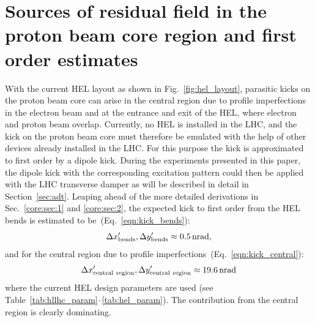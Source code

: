 \documentclass[%
 reprint,
 amsmath,amssymb,
 aps,
prstab,
]{revtex4-1}
\begin{document}
\section{Sources of residual field in the proton beam core region and first order estimates\label{sec:core}}
With the current HEL layout as shown in Fig.~\ref{fig:hel_layout}, parasitic kicks on the proton beam core can arise in the central region due to profile imperfections in the electron beam and at the entrance and exit of the HEL, where electron and proton beam overlap. Currently, no HEL is installed in the LHC, and the kick on the proton beam core must therefore be emulated with the help of other devices already installed in the LHC. For this purpose the kick is approximated to first order by a dipole kick. During the experiments presented in this paper, the dipole kick with the corresponding excitation pattern could then be applied with the LHC transverse damper as will be described in detail in Section~\ref{sec:adt}. Leaping ahead of the more detailed derivations in Sec.~\ref{core:sec:1} and \ref{core:sec:2}, the expected kick to first order from the HEL bends is estimated to be~(Eq.~\ref{eqn:kick_bends}):
\begin{equation}
	\Delta x'_{\rm{bends}},\Delta y'_{\rm{bends}}\approx \SI{0.5}{nrad},
\end{equation}
and for the central region due to profile imperfections~(Eq.~\ref{eqn:kick_central}):
\begin{equation}
	\Delta x'_{\rm{central \ region}}, \Delta y'_{\rm{central \ region}} \approx \SI{19.6}{nrad}
\end{equation}
where the current HEL design parameters are used (see Table~\ref{tab:hllhc_param}--\ref{tab:hel_param}). The contribution from the central region is clearly dominating.
\end{document}
